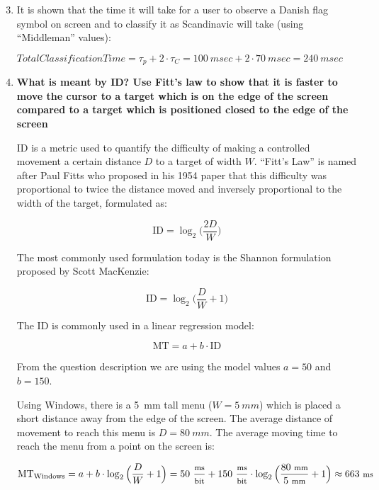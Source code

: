 \begin{enumerate}
\setcounter{enumi}{2}

\item[] It is shown that the time it will take for a user to observe a Danish flag symbol on screen and to classify it as Scandinavic will take (using ``Middleman'' values):

$\textit{TotalClassificationTime} = \tau_p + 2 \cdot \tau_C = 100~\textit{msec} + 2 \cdot 70~\textit{msec} = 240~\textit{msec}$

\item \textbf{What is meant by \acf{ID}? Use Fitt's law to show that it is faster to move the cursor to a target which is on the edge of the screen compared to a target which is positioned closed to the edge of the screen}

\acf{ID} is a metric used to quantify the difficulty of making a controlled movement a certain distance $D$ to a target of width $W$. ``Fitt's Law'' is named after Paul Fitts who proposed in his 1954 paper that this difficulty was proportional to twice the distance moved and inversely proportional to the width of the target, formulated as:

\begin{displaymath}
\text{ID} = \log_2\big(\frac{2D}{W}\big)
\end{displaymath}

The most commonly used formulation today is the Shannon formulation proposed by Scott MacKenzie:

\begin{displaymath}
\text{ID} = \log_2\big(\frac{D}{W} + 1\big)
\end{displaymath}

The \ac{ID} is commonly used in a linear regression model:

\begin{displaymath}
\text{MT} = a + b \cdot \text{ID}
\end{displaymath}

From the question description we are using the model values $a = 50$ and $b = 150$.

Using Windows, there is a 5~mm tall menu ($W = 5~mm$) which is placed a short distance away from the edge of the screen. The average distance of movement to reach this menu is $D = 80~mm$. The average moving time to reach the menu from a point on the screen is:

\begin{displaymath}
\text{MT}_\text{Windows} = a + b \cdot \log_2\Big(\frac{D}{W} + 1\Big) = 50~{\footnotesize \frac{\text{ms}}{\text{bit}}} + 150~{\footnotesize \frac{\text{ms}}{\text{bit}}} \cdot \log_2\Big(\frac{80~\text{\footnotesize mm}}{5~\text{\footnotesize mm}} + 1\Big) \approx 663~\text{\footnotesize ms}
\end{displaymath}


\end{enumerate}
